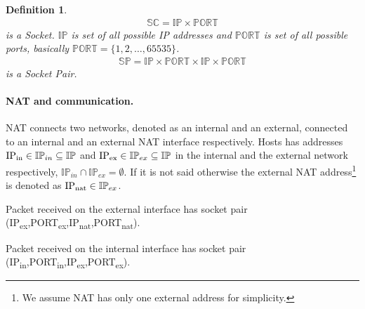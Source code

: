 \documentclass{llncs}
\newtheorem{mydef}{Definition}
\begin{document}
\begin{mydef}
\begin{align*}
\mathbb{SC} = \mathbb{IP} \times \mathbb{PORT}
\end{align*} is a Socket. $\mathbb{IP}$ is set of all possible IP addresses and $\mathbb{PORT}$ 
is set of all possible ports, basically $\mathbb{PORT} = \{1,2,\dots,65535\}$.
\begin{align*}
\mathbb{SP} = \mathbb{IP} \times \mathbb{PORT} \times \mathbb{IP} \times \mathbb{PORT}
\end{align*} is a Socket Pair.
\end{mydef}
% 

\paragraph{NAT and communication.}
NAT connects two networks, denoted as an internal and an external, connected to an internal and an external NAT interface respectively.
Hosts has addresses $\text{IP\textsubscript{in}} \in \mathbb{IP}_{in} \subseteq \mathbb{IP}$ 
and $\text{IP\textsubscript{ex}} \in \mathbb{IP}_{ex} \subseteq \mathbb{IP}$ in the internal and the external network
respectively, $\mathbb{IP}_{in} \cap \mathbb{IP}_{ex} = \emptyset$.
If it is not said otherwise the external NAT address\footnote{We assume NAT has only one external address for simplicity.} is denoted as 
$\text{IP\textsubscript{nat}} \in \mathbb{IP}_{ex}$.

Packet received on the external interface has socket pair {(IP\textsubscript{ex},PORT\textsubscript{ex},IP\textsubscript{nat},PORT\textsubscript{nat})}.

Packet received on the internal interface has socket pair {(IP\textsubscript{in},PORT\textsubscript{in},IP\textsubscript{ex},PORT\textsubscript{ex})}.
\end{document}
